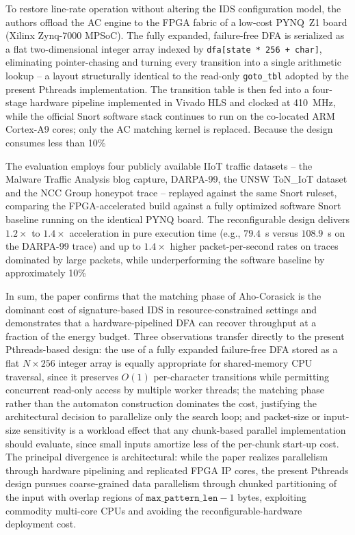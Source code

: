 To restore line-rate operation without altering the IDS configuration model, the authors offload the AC engine to the FPGA fabric of a low-cost PYNQ~Z1 board (Xilinx Zynq-7000 MPSoC). The fully expanded, failure-free DFA is serialized as a flat two-dimensional integer array indexed by \texttt{dfa[state * 256 + char]}, eliminating pointer-chasing and turning every transition into a single arithmetic lookup -- a layout structurally identical to the read-only \texttt{goto\_tbl} adopted by the present Pthreads implementation. The transition table is then fed into a four-stage hardware pipeline implemented in Vivado HLS and clocked at 410~MHz, while the official Snort software stack continues to run on the co-located ARM Cortex-A9 cores; only the AC matching kernel is replaced. Because the design consumes less than 10\%

The evaluation employs four publicly available IIoT traffic datasets -- the Malware Traffic Analysis blog capture, DARPA-99, the UNSW ToN\_IoT dataset and the NCC Group honeypot trace -- replayed against the same Snort ruleset, comparing the FPGA-accelerated build against a fully optimized software Snort baseline running on the identical PYNQ board. The reconfigurable design delivers $1.2\times$ to $1.4\times$ acceleration in pure execution time (e.g., $79.4$~s versus $108.9$~s on the DARPA-99 trace) and up to $1.4\times$ higher packet-per-second rates on traces dominated by large packets, while underperforming the software baseline by approximately 10\%

In sum, the paper confirms that the matching phase of Aho-Corasick is the dominant cost of signature-based IDS in resource-constrained settings and demonstrates that a hardware-pipelined DFA can recover throughput at a fraction of the energy budget. Three observations transfer directly to the present Pthreads-based design: the use of a fully expanded failure-free DFA stored as a flat $N \times 256$ integer array is equally appropriate for shared-memory CPU traversal, since it preserves $O(1)$ per-character transitions while permitting concurrent read-only access by multiple worker threads; the matching phase rather than the automaton construction dominates the cost, justifying the architectural decision to parallelize only the search loop; and packet-size or input-size sensitivity is a workload effect that any chunk-based parallel implementation should evaluate, since small inputs amortize less of the per-chunk start-up cost. The principal divergence is architectural: while the paper realizes parallelism through hardware pipelining and replicated FPGA IP cores, the present Pthreads design pursues coarse-grained data parallelism through chunked partitioning of the input with overlap regions of $\texttt{max\_pattern\_len}-1$ bytes, exploiting commodity multi-core CPUs and avoiding the reconfigurable-hardware deployment cost.

